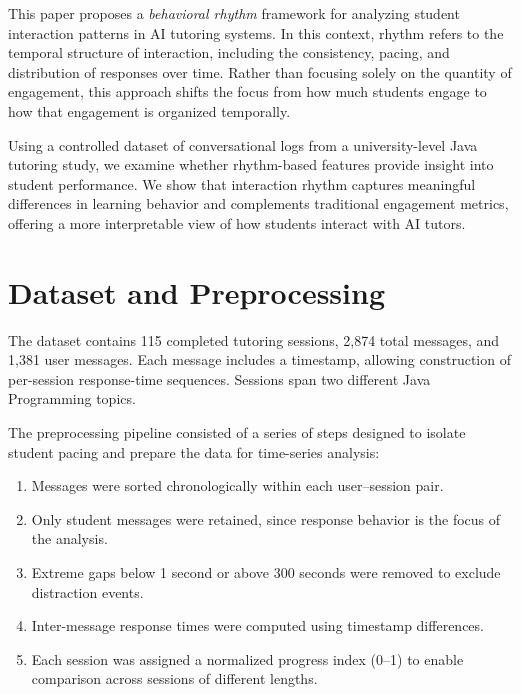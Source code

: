 \documentclass[10pt]{article}
\begin{document}
This paper proposes a \textit{behavioral rhythm} framework for analyzing student interaction patterns in AI tutoring systems. In this context, rhythm refers to the temporal structure of interaction, including the consistency, pacing, and distribution of responses over time. Rather than focusing solely on the quantity of engagement, this approach shifts the focus from how much students engage to how that engagement is organized temporally.

Using a controlled dataset of conversational logs from a university-level Java tutoring study, we examine whether rhythm-based features provide insight into student performance. We show that interaction rhythm captures meaningful differences in learning behavior and complements traditional engagement metrics, offering a more interpretable view of how students interact with AI tutors.

\section{Dataset and Preprocessing}

The dataset contains 115 completed tutoring sessions, 2,874 total messages, and 1,381 user messages. Each message includes a timestamp, allowing construction of per-session response-time sequences. Sessions span two different Java Programming topics.

The preprocessing pipeline consisted of a series of steps designed to isolate student pacing and 
prepare the data for time-series analysis:


\begin{enumerate}
    \item Messages were sorted chronologically within each user–session pair.
    \item Only student messages were retained, since response behavior is the focus of the analysis.
    \item Extreme gaps below 1 second or above 300 seconds were removed to exclude distraction events.
    \item Inter-message response times were computed using timestamp differences.
    \item Each session was assigned a normalized progress index (0–1) to enable comparison across sessions of different lengths.
\end{enumerate}



\end{document}
